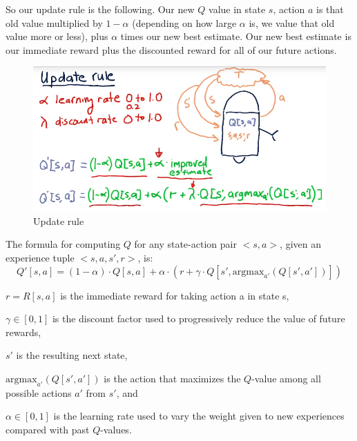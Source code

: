 \documentclass[12pt]{article}
\begin{document}
So our update rule is the following. Our new $Q$ value in state $s$, action $a$ is that old value multiplied by $1-\alpha$ (depending on how large $\alpha$ is, we value that old value more or less), plus $\alpha$ times our new best estimate. Our new best estimate is our immediate reward plus the discounted reward for all of our future actions. 

\begin{figure}[!ht]
\centering
\includegraphics[scale=0.45]{fig/fig106}
\caption{Update rule}
\end{figure}

The formula for computing $Q$ for any state-action pair $<s, a>$, given an experience tuple $<s, a, s', r>$, is:
\begin{equation}
Q'[s, a] = (1 - \alpha) \cdot Q[s, a] + \alpha \cdot (r + \gamma \cdot Q[s', \text{argmax}_{a'}(Q[s', a'])])
\end{equation}
\begin{description}[font=$\bullet$\scshape\bfseries]
\item $r = R[s, a]$ is the immediate reward for taking action a in state s, \\[-35pt]
\item $\gamma \in [0, 1]$ is the discount factor used to progressively reduce the value of future rewards,\\[-35pt]
\item $s'$ is the resulting next state, \\[-35pt]
\item $\text{argmax}_{a'}(Q[s', a'])$ is the action that maximizes the $Q$-value among all possible actions $a'$ from $s'$, and \\[-35pt]
\item $\alpha \in [0, 1]$ is the learning rate used to vary the weight given to new experiences compared with past $Q$-values.
\end{description}
\end{document}
